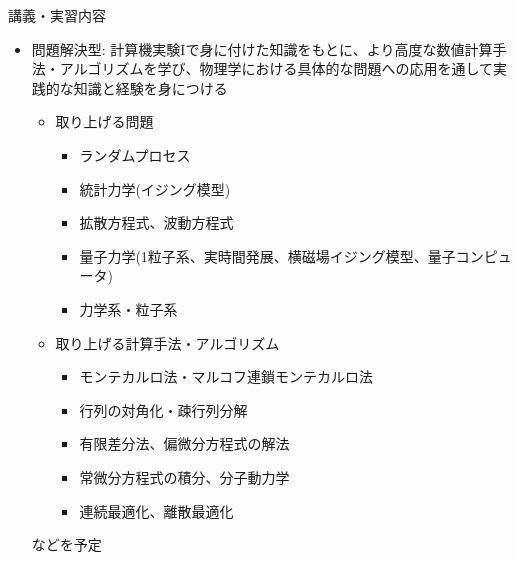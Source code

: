 \begin{frame}[t]{講義・実習内容}
  \begin{itemize}
    \setlength{\itemsep}{1em}
  \item 問題解決型: 計算機実験Iで身に付けた知識をもとに、より高度な数値計算手法・アルゴリズムを学び、物理学における具体的な問題への応用を通して実践的な知識と経験を身につける
    \begin{itemize}
    \item 取り上げる問題
      \begin{itemize}
      \item ランダムプロセス
      \item 統計力学(イジング模型)
      \item 拡散方程式、波動方程式
      \item 量子力学(1粒子系、実時間発展、横磁場イジング模型、量子コンピュータ)
      \item 力学系・粒子系
        
      \end{itemize}
    \item 取り上げる計算手法・アルゴリズム
      \begin{itemize}
      \item モンテカルロ法・マルコフ連鎖モンテカルロ法
      \item 行列の対角化・疎行列分解
      \item 有限差分法、偏微分方程式の解法
      \item 常微分方程式の積分、分子動力学
      \item 連続最適化、離散最適化
      \end{itemize}
    \end{itemize}
    などを予定
  \end{itemize}
\end{frame}




